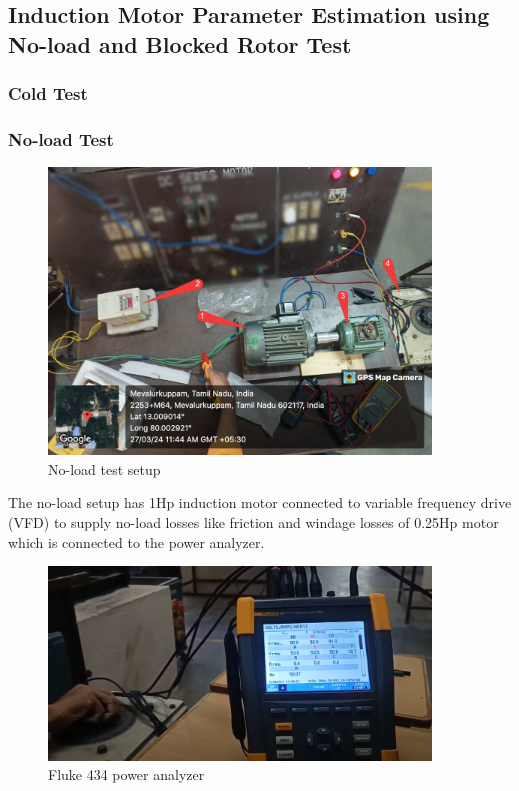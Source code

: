 \subsection{Induction Motor Parameter Estimation using No-load and Blocked Rotor Test}


\subsubsection{Cold Test}

\subsubsection{No-load Test}


\begin{figure}
    \centering
    \includegraphics[width=4in]{sections/section5/images/ParamEstim/SetupNoload.jpg}
    \caption{No-load test setup}
    \label{fig:no_load_test_setup}
\end{figure}

The no-load setup has 1Hp induction motor connected to variable frequency drive (VFD) to supply no-load losses like friction and windage losses of 0.25Hp motor which is connected to the power analyzer. 



\begin{figure}[H]
    \centering
    \includegraphics[width=4in]{sections/section5/images/ParamEstim/FlukeVoltAmpHertz.png}
    \caption{Fluke 434 power analyzer}
    \label{fig:fluke434}
\end{figure}

